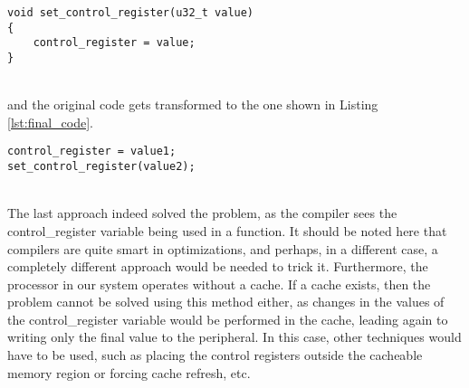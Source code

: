 \noindent
\begin{minipage}{\linewidth}
\begin{lstlisting}[style=mycodestyle, label={lst:workaround}, caption={Workaround to stop the compiler from optimizing a code segment}] 
void set_control_register(u32_t value)
{
	control_register = value;
}
\end{lstlisting}
\end{minipage}\\

\noindent
and the original code gets transformed to the one shown in Listing \ref{lst:final_code}.\\

\noindent
\begin{minipage}{\linewidth}
\begin{lstlisting}[style=mycodestyle, label={lst:final_code}, caption={Successfully setting peripheral control signals}] 
control_register = value1;
set_control_register(value2);
\end{lstlisting}
\end{minipage}\\

The last approach indeed solved the problem, as the compiler sees the control\_register variable being used in a function. It should be noted here that compilers are quite smart in optimizations, and perhaps, in a different case, a completely different approach would be needed to trick it. Furthermore, the processor in our system operates without a cache. If a cache exists, then the problem cannot be solved using this method either, as changes in the values of the control\_register variable would be performed in the cache, leading again to writing only the final value to the peripheral. In this case, other techniques would have to be used, such as placing the control registers outside the cacheable memory region or forcing cache refresh, etc.
